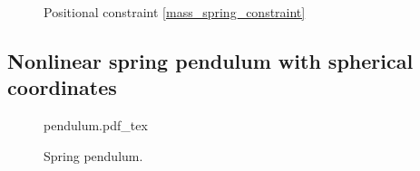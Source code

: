 \documentclass{multibody2023_full_paper}
\newlength\figH
\newlength\figW
\begin{document}
\begin{figure}[t!]
    \centering
    \setlength{\figH}{0.18\textheight}
    \setlength{\figW}{0.6\textwidth}
    
    \caption{Positional constraint \eqref{mass_spring_constraint}}
    \label{fig:massspring_constraint}
\end{figure}

\subsection{Nonlinear spring pendulum with spherical coordinates}

\begin{figure}[b!]
    \centering
    \def\svgwidth{0.4\textwidth}
    {pendulum.pdf_tex}
    \caption{Spring pendulum.}
    \label{fig:pendulum}
\end{figure}
\end{document}
